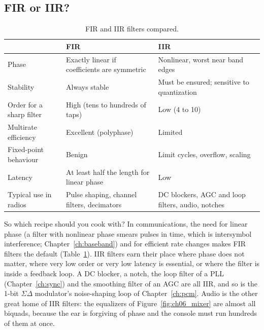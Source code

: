 \subsection{FIR or IIR?}

\begin{table}[htbp]\centering\small
\caption{FIR and IIR filters compared.}\label{tab:ch06:firiir}
\begin{tabular}{p{3.2cm}p{5.3cm}p{5.3cm}}
\toprule
& FIR & IIR \\
\midrule
Phase & Exactly linear if coefficients are symmetric & Nonlinear, worst near band edges \\
Stability & Always stable & Must be ensured; sensitive to quantization \\
Order for a sharp filter & High (tens to hundreds of taps) & Low (4 to 10) \\
Multirate efficiency & Excellent (polyphase) & Limited \\
Fixed-point behaviour & Benign & Limit cycles, overflow, scaling \\
Latency & At least half the length for linear phase & Low \\
Typical use in radios & Pulse shaping, channel filters, decimators & DC blockers, AGC and loop filters, audio, notches \\
\bottomrule
\end{tabular}
\end{table}

So which recipe should you cook with? In communications, the need for linear phase (a filter with
nonlinear phase smears pulses in time, which is intersymbol interference; Chapter~\ref{ch:baseband})
and for efficient rate changes makes FIR filters the default (Table~\ref{tab:ch06:firiir}). IIR
filters earn their place where phase does not matter, where very low order or very low latency is
essential, or where the filter is inside a feedback loop. A DC blocker, a notch, the loop filter of
a PLL (Chapter~\ref{ch:sync}) and the smoothing filter of an AGC are all IIR, and so is the 1-bit
$\Sigma\Delta$ modulator's noise-shaping loop of Chapter~\ref{ch:pcm}. Audio is the other great
home of IIR filters: the equalizers of Figure~\ref{fig:ch06_mixer} are almost all biquads, because
the ear is forgiving of phase and the console must run hundreds of them at once.


